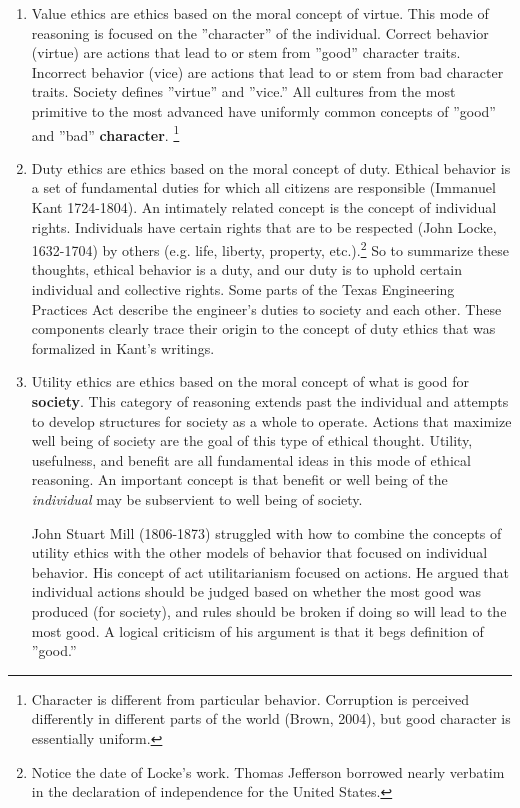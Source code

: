 \begin{enumerate}

\item Value ethics are ethics based on the moral concept of virtue.  This mode of reasoning is focused on the ''character'' of the individual. Correct behavior (virtue) are actions that lead to or stem from ''good'' character traits.  Incorrect behavior (vice) are actions that lead to or stem from bad character traits.
Society defines ''virtue'' and ''vice.''  All cultures from the most primitive to the most advanced have uniformly common concepts of ''good'' and ''bad'' \textbf{character}. \footnote{Character is different from particular behavior.  Corruption is perceived differently in different parts of the world (Brown, 2004), but good character is essentially uniform.}

\item Duty ethics are ethics based on the moral concept of duty.  Ethical behavior is a set of fundamental duties for which  all citizens are responsible (Immanuel Kant 1724-1804).  An intimately related concept is the concept of individual rights.  Individuals have certain rights that are to be respected (John Locke, 1632-1704) by others (e.g. life, liberty, property, etc.).\footnote{Notice the date of Locke's work.  Thomas Jefferson borrowed nearly verbatim in the declaration of independence for the United States.}  So to summarize these thoughts,  ethical behavior is a duty, and our duty is to uphold certain individual and collective rights.  Some parts of the Texas Engineering Practices Act describe the engineer's duties to society and each other.  These components clearly trace their origin to the concept of duty ethics that was formalized in Kant's writings. 

\item Utility ethics are ethics based on the moral concept of what is good for \textbf{society}.  This category of reasoning extends past the individual and attempts to develop structures for society as a whole to operate. Actions that maximize well being of society are the goal of this type of ethical thought.
Utility, usefulness, and benefit are all fundamental ideas in this mode of ethical reasoning.  An important concept is that benefit or well being of the \textsl{individual} may be subservient to well being of society.

John Stuart Mill (1806-1873) struggled with how to combine the concepts of utility ethics with the other models of behavior that focused on individual behavior.  His concept of act utilitarianism focused on actions.  He argued that  individual actions should be judged based on whether the most good was produced (for society), and rules should be broken if doing so will lead to the most good.  A logical criticism of his argument is that it begs definition of ''good.''  


\end{enumerate}
